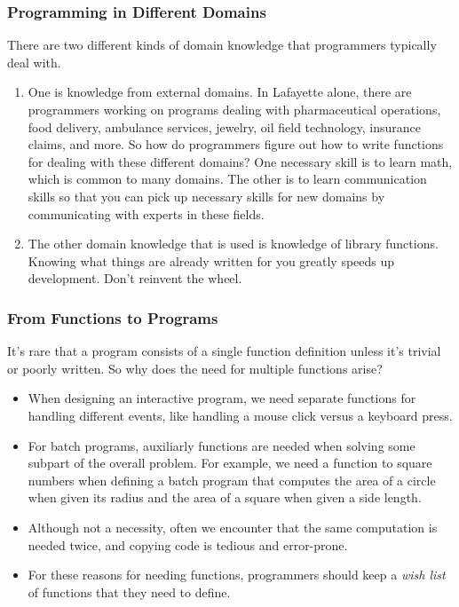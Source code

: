 \documentclass{beamer}
\begin{document}
\begin{frame}
  \frametitle{Programming in Different Domains}
  There are two different kinds of domain knowledge that programmers typically deal with.
  \begin{enumerate}
  \item<2-> One is knowledge from external domains. In Lafayette alone, there are programmers working on programs dealing with pharmaceutical operations, food  delivery, ambulance services, jewelry, oil field technology, insurance claims, and more. So  how do programmers figure out how to write functions
    for dealing with these different domains? One necessary skill is to learn math, which is common to many domains. The other is to learn communication skills so that you can pick up necessary skills for new domains by communicating with experts in these fields.
  \item<3-> The other domain knowledge that is used is knowledge of library functions. Knowing what things are already written for you greatly speeds up development.
    Don't reinvent the wheel.
  \end{enumerate}  
\end{frame}

\begin{frame}
  \frametitle{From Functions to Programs}
  It's rare that a program consists of a single function definition unless it's trivial or poorly written. So why does the need for multiple functions arise?
  \begin{itemize}
  \item<2-> When designing an interactive program, we need separate functions for handling different events, like handling a mouse click versus a keyboard press.
  \item<3-> For batch programs, auxiliarly functions are needed when solving some subpart of the overall problem. For example, we need a function to square numbers
    when defining a batch program that computes the area of a circle when given its radius and the area of a square when given a side length.
  \item<4-> Although not a necessity, often we encounter that the same computation is needed twice, and copying code is tedious and error-prone.
  \item<5-> For these reasons for needing functions, programmers should keep a \emph{wish list} of functions that they need to define.
  \end{itemize}
  
\end{frame}
\end{document}
